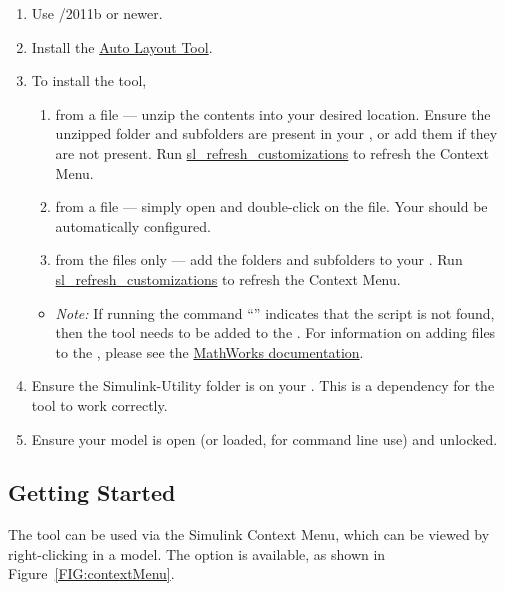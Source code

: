 \documentclass{article}
\newcommand{\menu}[1]{%
	\ifthenelse{\equal{#1}{1}}{Flatten Subsystem}{}%
  	\ifthenelse{\equal{#1}{2}}{?}{}%
}
\begin{document}
\begin{enumerate}
	\item Use \Matlab/\Simulink 2011b or newer.
	\item Install the \href{https://github.com/McSCert/Auto-Layout}{Auto Layout Tool}.
	\item To install the tool,
	\begin{enumerate}
		\item from a  file --- unzip the contents into your desired location. Ensure the unzipped folder and subfolders are present in your \mpath, or add them if they are not present. Run \href{https://www.mathworks.com/help/simulink/ug/registering-customizations.html}{sl\_refresh\_customizations} to refresh the Context Menu. 
		\item from a  file --- simply open \Matlab and double-click on the file. Your \mpath should be automatically configured.
		\item from the files only --- add the folders and subfolders to your \mpath. Run \href{https://www.mathworks.com/help/simulink/ug/registering-customizations.html}{sl\_refresh\_customizations} to refresh the Context Menu.
	\end{enumerate}
	\begin{itemize}
		\item \textit{Note:} If running the command ``'' indicates that the script is not found, then the tool needs to be added to the \mpath.
		For information on adding files to the \mpath, please see the \href{https://www.mathworks.com/help/matlab/matlab_env/add-remove-or-reorder-folders-on-the-search-path.html}{MathWorks documentation}.
	\end{itemize}
	\item Ensure the Simulink-Utility folder is on your \mpath. This is a dependency for the tool to work correctly.
	\item Ensure your model is open (or loaded, for command line use) and unlocked.
\end{enumerate}

\subsection{Getting Started}
The tool can be used via the Simulink Context Menu, which can be viewed by right-clicking in a model. The \emph{\menu{1}} option is available, as shown in Figure~\ref{FIG:contextMenu}.
\end{document}
